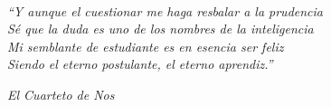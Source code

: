 \thispagestyle{empty}
\begin{flushright}
	\begin{minipage}{12.5cm}
		\noindent
		\\[20em]
		\begin{flushright}
				\textit{
				“Y aunque el cuestionar me haga resbalar a la prudencia \\
				Sé que la duda es uno de los nombres de la inteligencia \\
				Mi semblante de estudiante es en esencia ser feliz \\
				Siendo el eterno postulante, el eterno aprendiz.”}
			\\[1em]
		\end{flushright}
		\begin{flushright}
			\textit{El Cuarteto de Nos}
		\end{flushright}
		
	\end{minipage}
\end{flushright} 



